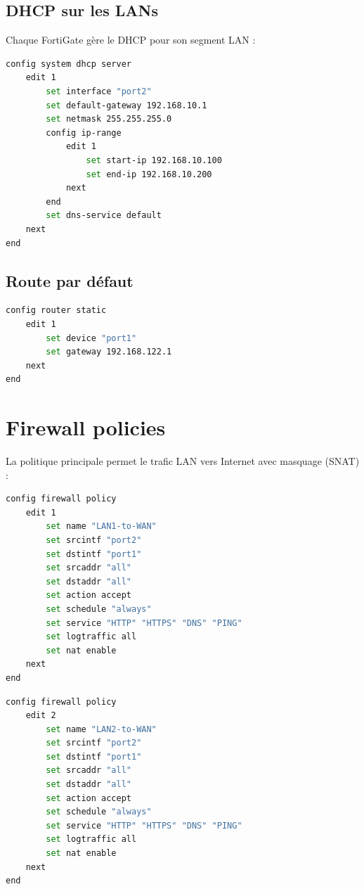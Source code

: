 \subsection{DHCP sur les LANs}

Chaque FortiGate gère le DHCP pour son segment LAN :

\begin{lstlisting}[language=bash, caption={Serveur DHCP FGT-Primary pour LAN1}]
config system dhcp server
    edit 1
        set interface "port2"
        set default-gateway 192.168.10.1
        set netmask 255.255.255.0
        config ip-range
            edit 1
                set start-ip 192.168.10.100
                set end-ip 192.168.10.200
            next
        end
        set dns-service default
    next
end
\end{lstlisting}

\subsection{Route par défaut}

\begin{lstlisting}[language=bash, caption={Route par défaut vers Internet}]
config router static
    edit 1
        set device "port1"
        set gateway 192.168.122.1
    next
end
\end{lstlisting}

\section{Firewall policies}

La politique principale permet le trafic LAN vers Internet avec masquage (SNAT) :

\begin{lstlisting}[language=bash, caption={Politique LAN1 vers WAN}]
config firewall policy
    edit 1
        set name "LAN1-to-WAN"
        set srcintf "port2"
        set dstintf "port1"
        set srcaddr "all"
        set dstaddr "all"
        set action accept
        set schedule "always"
        set service "HTTP" "HTTPS" "DNS" "PING"
        set logtraffic all
        set nat enable
    next
end
\end{lstlisting}

\begin{lstlisting}[language=bash, caption={Politique LAN2 vers WAN}]
config firewall policy
    edit 2
        set name "LAN2-to-WAN"
        set srcintf "port2"
        set dstintf "port1"
        set srcaddr "all"
        set dstaddr "all"
        set action accept
        set schedule "always"
        set service "HTTP" "HTTPS" "DNS" "PING"
        set logtraffic all
        set nat enable
    next
end
\end{lstlisting}

